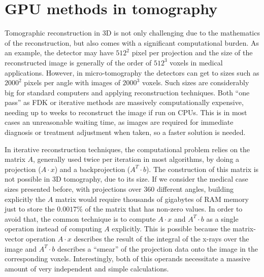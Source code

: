 
\chapter{GPU methods in tomography}

Tomographic reconstruction in 3D is not only challenging due to the mathematics of the reconstruction, but also comes with a significant computational burden. As an example, the detector may have $512^2$ pixel per projection and the size of the reconstructed image is generally of the order of $512^3$ voxels in medical applications. However, in micro-tomography the detectors can get to sizes such as $2000^2$ pixels per angle with images of $2000^3$ voxels. Such sizes are considerably big for standard computers and applying reconstruction techniques. Both ``one pass'' as FDK or iterative methods are massively computationally expensive, needing up to weeks to reconstruct the image if run on CPUs. This is in most cases an unreasonable waiting time, as images are required for immediate  diagnosis or treatment adjustment when taken, so a faster solution is needed.

In iterative reconstruction techniques, the computational problem relies on the matrix $A$, generally used twice per iteration in most algorithms, by doing a projection ($A\cdot x$) and a backprojection ($A^T\cdot b$). The construction of this matrix is not possible in 3D tomography, due to its size. If we consider the medical case sizes presented before, with projections over 360 different angles, building explicitly the $A$ matrix would require thousands of gigabytes of RAM memory just to store the $0.0017\%$ of the matrix that has non-zero values. In order to avoid that, the common technique is to compute $A\cdot x$ and $A^T\cdot b$ as a single operation instead of computing $A$ explicitly. This is possible because the matrix-vector operation $A\cdot x$ describes the result of the integral of the x-rays over the image and $A^T\cdot b$ describes a ``smear'' of the projection data onto the image in the corresponding voxels. Interestingly, both of this operands necessitate a massive amount of very independent and simple calculations.

